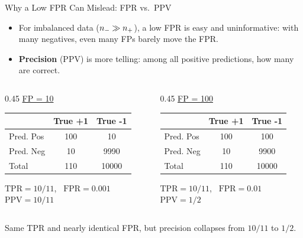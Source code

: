 \documentclass[11pt,compress,t,notes=noshow, xcolor=table]{beamer}
\begin{document}
\begin{frame}{Why a Low FPR Can Mislead: FPR vs.\ PPV}
    \small
    \begin{itemize}
        \item For imbalanced data ($n_{-} \gg n_{+}$), a low FPR is easy and uninformative: with many negatives, even many FPs barely move the FPR.
        \item \textbf{Precision} (PPV) is more telling: among all positive predictions, how many are correct.
    \end{itemize}
    \begin{columns}
        \footnotesize
        \begin{column}{0.45\textwidth}
            \centering \underline{FP = 10}\\ \lz
            {\tiny
            \begin{tabular}{|l|c|c|}
                \hline
                & True +1 & True -1 \\ \hline
                Pred. Pos & 100 & 10 \\ \hline
                Pred. Neg & 10 & 9990 \\ \hline
                Total & 110 & 10000 \\ \hline
            \end{tabular}}

            \medskip
            $\text{TPR} = 10/11$, \ $\text{FPR} = 0.001$\\
            $\text{PPV} = 10/11$
        \end{column}
        \begin{column}{0.45\textwidth}
            \centering \underline{FP = 100}\\ \lz
            {\tiny
            \begin{tabular}{|l|c|c|}
                \hline
                & True +1 & True -1 \\ \hline
                Pred. Pos & 100 & 100 \\ \hline
                Pred. Neg & 10 & 9900 \\ \hline
                Total & 110 & 10000 \\ \hline
            \end{tabular}}

            \medskip
            $\text{TPR} = 10/11$, \ $\text{FPR} = 0.01$\\
            $\text{PPV} = 1/2$
        \end{column}
    \end{columns}
    \vspace{6pt}
    \footnotesize Same TPR and nearly identical FPR, but precision collapses from $10/11$ to $1/2$.
\end{frame}
\end{document}

